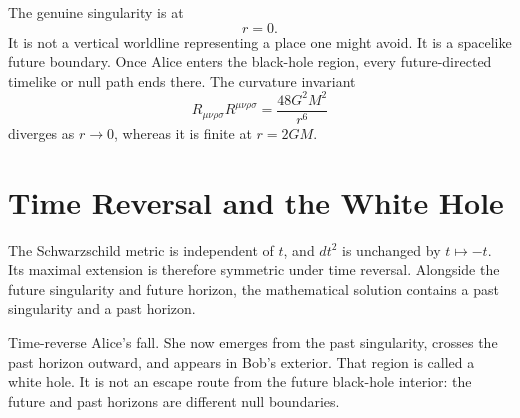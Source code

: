 The genuine singularity is at
\begin{equation}
r=0.
\end{equation}
It is not a vertical worldline representing a place one might avoid. It is a spacelike future boundary. Once Alice enters the black-hole region, every future-directed timelike or null path ends there. The curvature invariant
\begin{equation}
R_{\mu\nu\rho\sigma}R^{\mu\nu\rho\sigma}
=\frac{48G^2M^2}{r^6}
\label{eq:l04-kretschmann}
\end{equation}
diverges as \(r\to0\), whereas it is finite at \(r=2GM\).

\section{Time Reversal and the White Hole}

The Schwarzschild metric is independent of \(t\), and \(dt^2\) is unchanged by \(t\mapsto-t\). Its maximal extension is therefore symmetric under time reversal. Alongside the future singularity and future horizon, the mathematical solution contains a past singularity and a past horizon.

Time-reverse Alice's fall. She now emerges from the past singularity, crosses the past horizon outward, and appears in Bob's exterior. That region is called a white hole. It is not an escape route from the future black-hole interior: the future and past horizons are different null boundaries.

\begin{classroomqa}
\end{classroomqa}

\begin{classroomqa}
\end{classroomqa}

